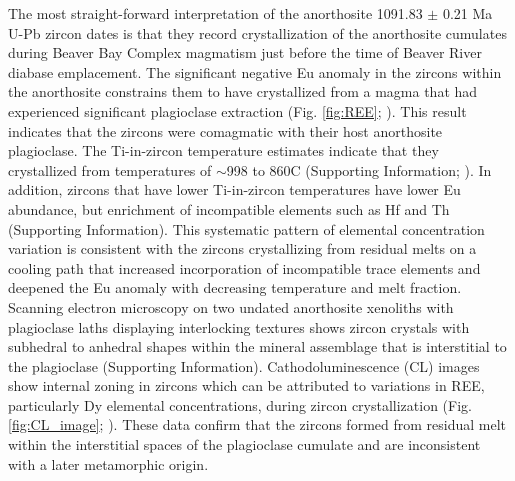 The most straight-forward interpretation of the anorthosite 1091.83 $\pm$ 0.21 Ma U-Pb zircon dates is that they record crystallization of the anorthosite cumulates during Beaver Bay Complex magmatism just before the time of Beaver River diabase emplacement. The significant negative Eu anomaly in the zircons within the anorthosite constrains them to have crystallized from a magma that had experienced significant plagioclase extraction (Fig. \ref{fig:REE}; ). This result indicates that the zircons were comagmatic with their host anorthosite plagioclase. The Ti-in-zircon temperature estimates indicate that they crystallized from temperatures of $\sim$998 to 860\textdegree C (Supporting Information; ). In addition, zircons that have lower Ti-in-zircon temperatures have lower Eu abundance, but enrichment of incompatible elements such as Hf and Th (Supporting Information). This systematic pattern of elemental concentration variation is consistent with the zircons crystallizing from residual melts on a cooling path that increased incorporation of incompatible trace elements and deepened the Eu anomaly with decreasing temperature and melt fraction. Scanning electron microscopy on two undated anorthosite xenoliths with plagioclase laths displaying interlocking textures shows zircon crystals with subhedral to anhedral shapes within the mineral assemblage that is interstitial to the plagioclase (Supporting Information). Cathodoluminescence (CL) images show internal zoning in zircons which can be attributed to variations in REE, particularly Dy elemental concentrations, during zircon crystallization (Fig. \ref{fig:CL_image}; ). These data confirm that the zircons formed from residual melt within the interstitial spaces of the plagioclase cumulate and are inconsistent with a later metamorphic origin.

